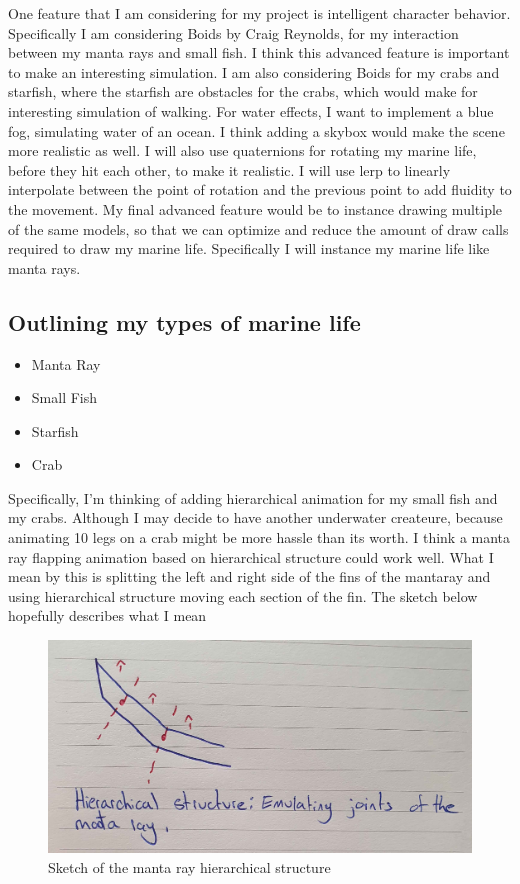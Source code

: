 \documentclass[a4paper, 10pt]{article}
\begin{document}
One feature that I am considering for my project is intelligent character behavior. Specifically I am considering Boids \cite{boids} by Craig Reynolds, for my interaction 
between my manta rays and small fish. I think this advanced feature is important to make an interesting simulation. I am also considering Boids for my crabs and starfish,
where the starfish are obstacles for the crabs, which would make for interesting simulation of walking. 
For water effects, I want to implement a blue fog, simulating water of an ocean. I think adding a skybox would make the scene more realistic as well. I will also use quaternions for rotating my marine life,
before they hit each other, to make it realistic. I will use lerp to linearly interpolate between the point of rotation and the previous point to add fluidity to the movement. My final advanced feature would
be to instance drawing multiple of the same models, so that we can optimize and reduce the amount of draw calls required to draw my marine life. Specifically I will instance my marine life like manta rays.

\subsection{Outlining my types of marine life}
\begin{itemize}
    \item Manta Ray
    \item Small Fish
    \item Starfish
    \item Crab
\end{itemize}
Specifically, I'm thinking of adding hierarchical animation for my small fish and my crabs. Although I may decide to have another underwater createure, because animating 10 legs on a crab
might be more hassle than its worth. I think a manta ray flapping animation based on hierarchical structure could work well. What I mean by this is splitting the left and right side of the 
fins of the mantaray and using hierarchical structure moving each section of the fin. The sketch below hopefully describes what I mean

\begin{figure}[h!]
    \centering
    \includegraphics[scale=0.1]{images/mantaray-sketch.jpg}
    \caption{Sketch of the manta ray hierarchical structure}
    \label{fig:mantaray-sketch}
\end{figure}
\end{document}
